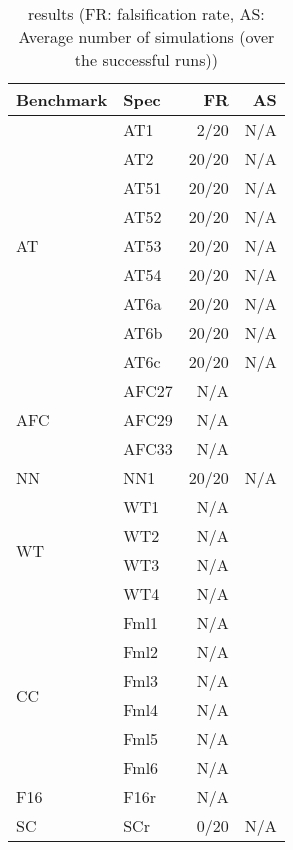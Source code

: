 	\begin{table}[!tb]
		\centering
		\caption{\FalStar results (FR: falsification rate, AS: Average number of simulations (over the successful  runs))}
		\label{table:falstarResults}
		\begin{tabular}{llrr}
			\toprule
			Benchmark & Spec & FR & AS\\
			\midrule
			\multirow{9}{*}{AT}
			& AT1 & 2/20 & N/A\\
			& AT2 & 20/20 & N/A\\
			& AT51 & 20/20 & N/A\\
			& AT52 & 20/20 & N/A\\
			& AT53 & 20/20 & N/A\\
			& AT54 & 20/20 & N/A\\
			& AT6a & 20/20 & N/A\\
			& AT6b & 20/20 & N/A\\
			& AT6c & 20/20 & N/A\\
			\hline
			\multirow{3}{*}{AFC}
			& AFC27 & N/A\\
			& AFC29 & N/A\\
			& AFC33 & N/A\\
			\hline
			NN & NN1 & 20/20 & N/A\\
			\hline
			\multirow{4}{*}{WT}
			& WT1 & N/A\\
			& WT2 & N/A\\
			& WT3 & N/A\\
			& WT4 & N/A\\
			\hline
			\multirow{6}{*}{CC}
			& Fml1 & N/A\\
			& Fml2 & N/A\\
			& Fml3 & N/A\\
			& Fml4 & N/A\\
			& Fml5 & N/A\\
			& Fml6 & N/A\\
			\hline
			F16 & F16r & N/A\\
			\hline
			SC & SCr & 0/20 & N/A\\
			\bottomrule
		\end{tabular}
	\end{table}




